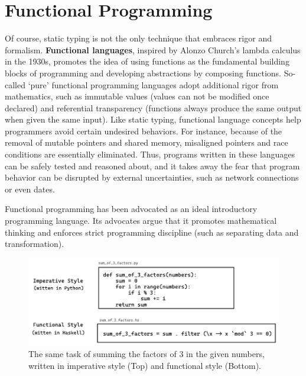\section{Functional Programming}
Of course, static typing is not the only technique that embraces rigor and formalism. \textbf{Functional languages}, inspired by Alonzo Church's lambda calculus \cite{Church1985-bx} in the 1930s, promotes the idea of using functions as the fundamental building blocks of programming and developing abstractions by composing functions. 
So-called `pure' functional programming languages adopt additional rigor from mathematics, such as immutable values (values can not be modified once declared) and referential transparency (functions always produce the same output when given the same input).  Like static typing, functional language concepts help programmers avoid certain undesired behaviors. For instance, because of the removal of mutable pointers and shared memory,  misaligned pointers and race conditions are essentially eliminated. Thus, programs written in these languages can be safely tested and reasoned about, and it takes away the fear that program behavior can be disrupted by external uncertainties, such as network connections or even dates. 

Functional programming has been advocated as an ideal introductory programming language. Its advocates argue that it promotes mathematical thinking and enforces strict programming discipline (such as separating data and transformation). 

\begin{figure}[hbt]
  \includegraphics[width=\linewidth]{ImperativeFunctional}
  \caption{
    \label{fig:imperative-vs-functional}
   The same task of summing the factors of 3 in the given numbers, written in imperative style (Top) and functional style (Bottom).
    }
\end{figure}

